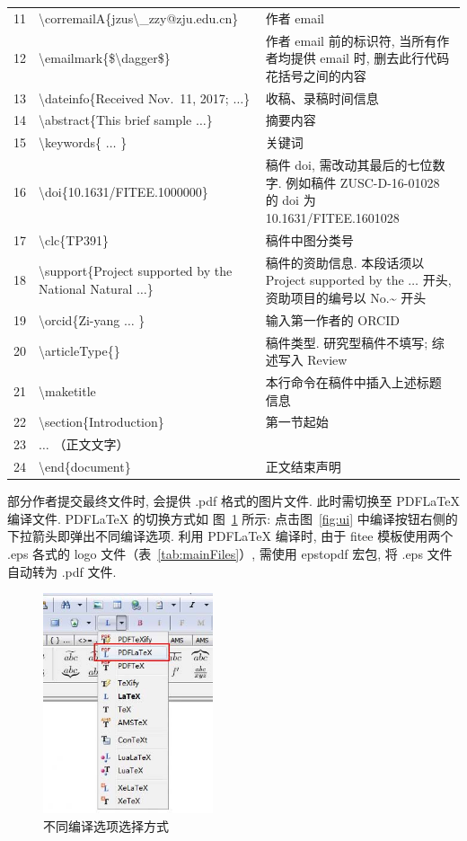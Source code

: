\documentclass[twoside,twocolumn]{article}
\begin{document}
\begin{CJK}{UTF8}{song}
\begin{table}[!t]
\begin{tabular*}{16.4cm}{@{\extracolsep{\fill}}rlp{7.2cm}}
		11 & \textbackslash corremailA\{jzus\textbackslash\_zzy@zju.edu.cn\}
		& 作者 email\\
		12 & \textbackslash emailmark\{\$\textbackslash dagger\$\}
		& 作者 email 前的标识符, 当所有作者均提供 email 时, 删去此行代码花括号之间的内容\\
		13 & \textbackslash dateinfo\{Received Nov.\ 11, 2017; $\ldots$\}
		& 收稿、录稿时间信息\\
		14 & \textbackslash abstract\{This brief sample $\ldots$\}
		& 摘要内容\\
		15 & \textbackslash keywords\{ $\ldots$ \}
		& 关键词\\
		16 & \textbackslash doi\{10.1631/FITEE.1000000\}
		& 稿件 doi, 需改动其最后的七位数字. 例如稿件 ZUSC-D-16-01028 的 doi 为
		10.1631/FITEE.1601028\\
		17 & \textbackslash clc\{TP391\}
		& 稿件中图分类号\\
		18 & \textbackslash support\{Project supported by the National Natural $\ldots$\}
		& 稿件的资助信息. 本段话须以 Project supported by the $\ldots$ 开头, 
		资助项目的编号以 No.\~{} 开头\\
		19 & \textbackslash orcid\{Zi-yang $\ldots$ \} & 输入第一作者的 ORCID\\
		20 & \textbackslash articleType\{\} & 稿件类型. 研究型稿件不填写; 综述写入 Review\\
		21 & \textbackslash maketitle       & 本行命令在稿件中插入上述标题信息\\
		22 & \textbackslash section\{Introduction\} & 第一节起始\\
		23 & $\ldots$ （正文文字）&  \\
		24 & \textbackslash end\{document\} &正文结束声明\\
		\bottomrule[0.75pt]
	\end{tabular*}
\end{table}


部分作者提交最终文件时, 会提供 .pdf 格式的图片文件. 
此时需切换至 PDFLaTeX 编译文件. PDFLaTeX 的切换方式如
图~\ref{fig:pdflatex} 所示: 点击图~\ref{fig:ui} 中编译按钮右侧的下拉箭头即弹出不同编译选项. 
利用 PDFLaTeX 编译时, 由于 fitee 模板使用两个 .eps 各式的 logo 文件（表~\ref{tab:mainFiles}）, 
需使用 epstopdf 宏包, 将 .eps 文件自动转为 .pdf 文件. 

\begin{figure}[!t]
\centering\small
\includegraphics[width = 5cm]{latexSum/pdflatex.jpg}
\caption{不同编译选项选择方式}
\label{fig:pdflatex}
\end{figure}


\end{CJK}
\end{document}
